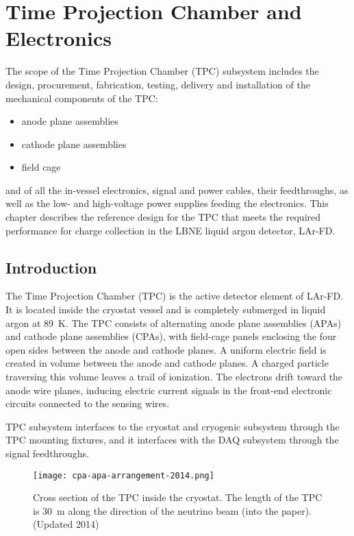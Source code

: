 \chapter{Time Projection Chamber and Electronics }
\label{ch:tpc}

The scope of the Time Projection Chamber (TPC) subsystem includes the design, procurement, fabrication, testing, delivery and installation of the mechanical components of the TPC: 
\begin{itemize}
\item anode plane assemblies 
\item cathode plane assemblies
\item field cage
\end{itemize}
and of all the in-vessel electronics, signal and power cables, their feedthroughs, as well as the 
low- and high-voltage power supplies feeding the electronics.  This chapter describes the reference design for the TPC that meets the required performance for charge collection in the LBNE liquid argon detector, LAr-FD.

\section{Introduction}

The Time Projection Chamber (TPC) is the active detector element of LAr-FD. It is located inside the cryostat 
vessel and is completely submerged in liquid argon at 89~K. The TPC consists of alternating anode plane assemblies (APAs) and cathode plane assemblies (CPAs), with field-cage panels enclosing the four open sides between the anode and cathode planes.
A uniform electric field is created in volume between the anode and cathode planes. A charged particle traversing this volume leaves a trail of ionization.  The electrons drift toward the anode wire planes, inducing electric current signals in the front-end electronic circuits connected to the sensing wires.

TPC subsystem interfaces to the cryostat and cryogenic subsystem through the TPC mounting fixtures, 
and it interfaces with the DAQ subsystem through the signal feedthroughs.

\begin{figure}
\centering
\texttt{[image: cpa-apa-arrangement-2014.png]}%
\caption[Cross section of the TPC inside the cryostat]{Cross section of the TPC inside the cryostat.  The length of the TPC is  30~m along the direction of the neutrino beam (into the paper). (Updated 2014) }
\label{fig:tpc-xsect1}
\end{figure}

